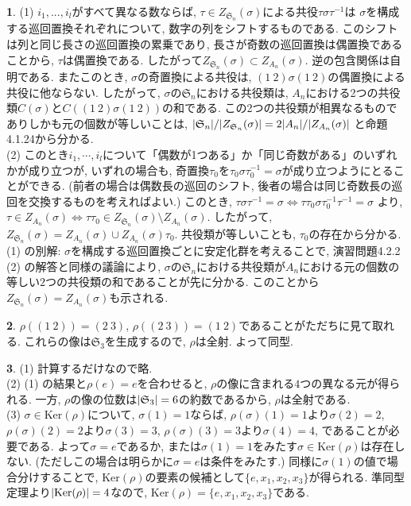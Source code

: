 \documentclass{article}
\theoremstyle{definition}
\newtheorem{ans}{}
\numberwithin{ans}{subsection}
\newcommand{\Ker}[1]{\mathrm{Ker}(#1)}
\DeclarePairedDelimiter{\abs}{\lvert}{\rvert}
\begin{document}
\begin{ans}
  (1) $i_1,..., i_l$がすべて異なる数ならば, $\tau \in Z_{\mathfrak{S}_n}(\sigma)$による共役$\tau\sigma\tau^{-1}$は
  $\sigma$を構成する巡回置換それぞれについて, 数字の列をシフトするものである.
  このシフトは列と同じ長さの巡回置換の累乗であり, 長さが奇数の巡回置換は偶置換であることから, $\tau$は偶置換である.
  したがって$Z_{\mathfrak{S}_n}(\sigma) \subset Z_{A_n}(\sigma)$. 逆の包含関係は自明である.
  またこのとき, $\sigma$の奇置換による共役は, $(1\ 2)\sigma(1\ 2)$の偶置換による共役に他ならない.
  したがって, $\sigma$の$\mathfrak{S}_n$における共役類は, $A_n$における2つの共役類$C(\sigma)$と$C((1\ 2)\sigma(1\ 2))$の和である.
  この2つの共役類が相異なるものでありしかも元の個数が等しいことは,
  $\abs{\mathfrak{S}_n}/\abs{Z_{\mathfrak{S}_n}(\sigma)} = 2\abs{A_n}/\abs{Z_{A_n}(\sigma)}$
  と命題4.1.24から分かる.\\
  (2) このとき$i_1,\cdots, i_l$について「偶数が1つある」か「同じ奇数がある」のいずれかが成り立つが,
  いずれの場合も, 奇置換$\tau_0$を$\tau_0\sigma\tau_0^{-1} = \sigma$が成り立つようにとることができる.
  (前者の場合は偶数長の巡回のシフト, 後者の場合は同じ奇数長の巡回を交換するものを考えればよい.)
  このとき, $\tau\sigma\tau^{-1} = \sigma \Longleftrightarrow \tau\tau_0\sigma\tau_0^{-1}\tau^{-1} = \sigma$
  より, $\tau \in Z_{A_n}(\sigma) \Longleftrightarrow \tau\tau_0 \in Z_{\mathfrak{S}_n}(\sigma) \setminus Z_{A_n}(\sigma)$.
  したがって, $Z_{\mathfrak{S}_n}(\sigma) = Z_{A_n}(\sigma) \cup Z_{A_n}(\sigma)\tau_0$.
  共役類が等しいことも, $\tau_0$の存在から分かる. \\
  (1) の別解: $\sigma$を構成する巡回置換ごとに安定化群を考えることで,
  演習問題4.2.2 (2) の解答と同様の議論により, $\sigma$の$\mathfrak{S}_n$における共役類が$A_n$における元の個数の等しい$2$つの共役類の和であることが先に分かる.
  このことから$Z_{\mathfrak{S}_n}(\sigma) = Z_{A_n}(\sigma)$も示される.
\end{ans}

\begin{ans}
  $\rho((1\ 2)) = (2\ 3)$, $\rho((2\ 3)) = (1\ 2)$であることがただちに見て取れる.
  これらの像は$\mathfrak{S}_3$を生成するので, $\rho$は全射. よって同型.
\end{ans}

\begin{ans}
  (1) 計算するだけなので略.\\
  (2) (1) の結果と$\rho(e) = e$を合わせると, $\rho$の像に含まれる$4$つの異なる元が得られる.
  一方, $\rho$の像の位数は$\abs{\mathfrak{S}_3} = 6$の約数であるから, $\rho$は全射である.\\
  (3) $\sigma \in \Ker{\rho}$について, $\sigma(1) = 1$ならば,
  $\rho(\sigma)(1) = 1$より$\sigma(2) = 2$,
  $\rho(\sigma)(2) = 2$より$\sigma(3) = 3$,
  $\rho(\sigma)(3) = 3$より$\sigma(4) = 4$,
  であることが必要である.
  よって$\sigma = e$であるか, または$\sigma(1) = 1$をみたす$\sigma \in \Ker{\rho}$は存在しない. (ただしこの場合は明らかに$\sigma = e$は条件をみたす.)
  同様に$\sigma(1)$の値で場合分けすることで, $\Ker{\rho}$の要素の候補として$\{e, x_1, x_2, x_3\}$が得られる.
  準同型定理より$\abs{\Ker{\rho}} = 4$なので, $\Ker{\rho} = \{e, x_1, x_2, x_3\}$である.
\end{ans}
\end{document}
